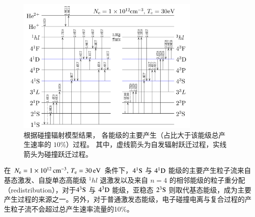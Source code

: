 \begin{figure}
    \centering
    \includegraphics[width=0.8\textwidth]{Ne1E12_Te30_1e7cm-3s-1.pdf}
    \caption{根据碰撞辐射模型结果，
    各能级的主要产生（占比大于该能级总产生速率的 $10\%$）过程。%
    其中，虚线箭头为自发辐射跃迁过程，实线箭头为碰撞跃迁过程。}%
    \label{fig:chap03:main-inflow}
\end{figure}

在 $N_{\rm e}=1\times10^{12}\,{\rm cm}^{-3},\,T_{\rm e}=30\,{\rm eV}$ 条件下，$4^1{\rm S}$ 与 $4^1{\rm D}$ 能级的主要产生粒子流来自基态激发、自旋单态高能级 $^1hl$ 退激发以及来自 $n=4$ 的相邻能级的粒子重分配（redistribution），对于$4^3{\rm S}$ 与 $4^3{\rm D}$ 能级，亚稳态 $2^3{\rm S}$ 则取代基态能级，成为主要产生过程的来源之一。另外，对于普通激发态能级，电子碰撞电离与复合过程的产生粒子流不会超过总产生速率流量的10\%。

